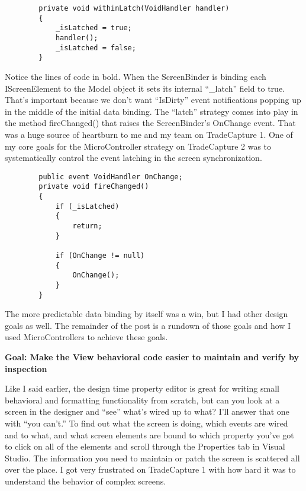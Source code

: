 \documentclass{article}
\begin{document}
{\begin{lstlisting}
        private void withinLatch(VoidHandler handler)
        {
            _isLatched = true;
            handler();
            _isLatched = false;
        } 
\end{lstlisting}

Notice the lines of code in bold.  When the ScreenBinder is binding each IScreenElement to the Model object it sets its internal “\_latch” field to true.  That's important because we don't want “IsDirty” event notifications popping up in the middle of the initial data binding.  The “latch” strategy comes into play in the method fireChanged() that raises the ScreenBinder's OnChange event.  That was a huge source of heartburn to me and my team on TradeCapture 1.  One of my core goals for the MicroController strategy on TradeCapture 2 was to systematically control the event latching in the screen synchronization.
 
\begin{lstlisting}
        public event VoidHandler OnChange;
        private void fireChanged()
        {
            if (_isLatched)
            {
                return;
            } 

            if (OnChange != null)
            {
                OnChange();
            }
        }
 \end{lstlisting}

The more predictable data binding by itself was a win, but I had other design goals as well.  The remainder of the post is a rundown of those goals and how I used MicroControllers to achieve these goals.

\Large {\textbf{Goal:  Make the View behavioral code easier to maintain and verify by inspection}}

Like I said earlier, the design time property editor is great for writing small behavioral and formatting functionality from scratch, but can you look at a screen in the designer and “see” what's wired up to what?  I'll answer that one with “you can't.”  To find out what the screen is doing, which events are wired and to what, and what screen elements are bound to which property you've got to click on all of the elements and scroll through the Properties tab in Visual Studio.  The information you need to maintain or patch the screen is scattered all over the place.  I got very frustrated on TradeCapture 1 with how hard it was to understand the behavior of complex screens.

}
\end{document}
